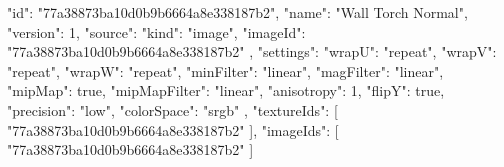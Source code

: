 {
  "id": "77a38873ba10d0b9b6664a8e338187b2",
  "name": "Wall Torch Normal",
  "version": 1,
  "source": {
    "kind": "image",
    "imageId": "77a38873ba10d0b9b6664a8e338187b2"
  },
  "settings": {
    "wrapU": "repeat",
    "wrapV": "repeat",
    "wrapW": "repeat",
    "minFilter": "linear",
    "magFilter": "linear",
    "mipMap": true,
    "mipMapFilter": "linear",
    "anisotropy": 1,
    "flipY": true,
    "precision": "low",
    "colorSpace": "srgb"
  },
  "textureIds": [
    "77a38873ba10d0b9b6664a8e338187b2"
  ],
  "imageIds": [
    "77a38873ba10d0b9b6664a8e338187b2"
  ]
}
